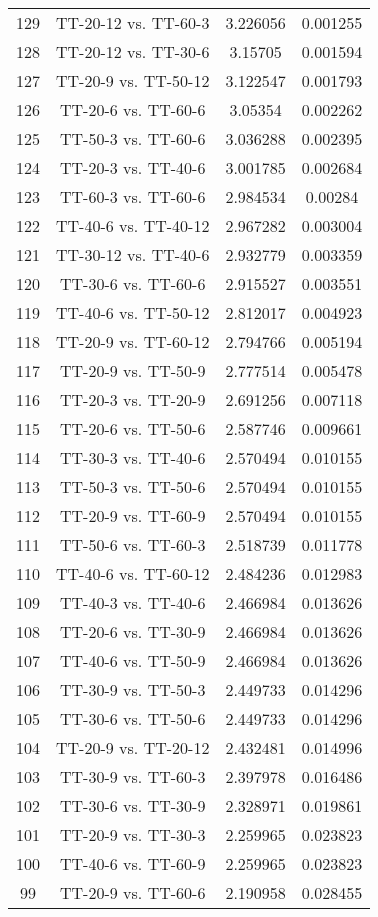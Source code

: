 \documentclass[a4paper,10pt]{article}
\begin{document}
\begin{landscape}
\begin{table}[!htp]
\begin{tabular}{cccc}
129&TT-20-12 vs. TT-60-3&3.226056&0.001255\\
128&TT-20-12 vs. TT-30-6&3.15705&0.001594\\
127&TT-20-9 vs. TT-50-12&3.122547&0.001793\\
126&TT-20-6 vs. TT-60-6&3.05354&0.002262\\
125&TT-50-3 vs. TT-60-6&3.036288&0.002395\\
124&TT-20-3 vs. TT-40-6&3.001785&0.002684\\
123&TT-60-3 vs. TT-60-6&2.984534&0.00284\\
122&TT-40-6 vs. TT-40-12&2.967282&0.003004\\
121&TT-30-12 vs. TT-40-6&2.932779&0.003359\\
120&TT-30-6 vs. TT-60-6&2.915527&0.003551\\
119&TT-40-6 vs. TT-50-12&2.812017&0.004923\\
118&TT-20-9 vs. TT-60-12&2.794766&0.005194\\
117&TT-20-9 vs. TT-50-9&2.777514&0.005478\\
116&TT-20-3 vs. TT-20-9&2.691256&0.007118\\
115&TT-20-6 vs. TT-50-6&2.587746&0.009661\\
114&TT-30-3 vs. TT-40-6&2.570494&0.010155\\
113&TT-50-3 vs. TT-50-6&2.570494&0.010155\\
112&TT-20-9 vs. TT-60-9&2.570494&0.010155\\
111&TT-50-6 vs. TT-60-3&2.518739&0.011778\\
110&TT-40-6 vs. TT-60-12&2.484236&0.012983\\
109&TT-40-3 vs. TT-40-6&2.466984&0.013626\\
108&TT-20-6 vs. TT-30-9&2.466984&0.013626\\
107&TT-40-6 vs. TT-50-9&2.466984&0.013626\\
106&TT-30-9 vs. TT-50-3&2.449733&0.014296\\
105&TT-30-6 vs. TT-50-6&2.449733&0.014296\\
104&TT-20-9 vs. TT-20-12&2.432481&0.014996\\
103&TT-30-9 vs. TT-60-3&2.397978&0.016486\\
102&TT-30-6 vs. TT-30-9&2.328971&0.019861\\
101&TT-20-9 vs. TT-30-3&2.259965&0.023823\\
100&TT-40-6 vs. TT-60-9&2.259965&0.023823\\
99&TT-20-9 vs. TT-60-6&2.190958&0.028455\\

\end{tabular}
\end{table}
\end{landscape}
\end{document}
